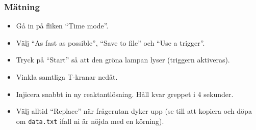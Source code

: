 \subsubsection{Mätning}
\begin{itemize}
\item Gå in på fliken ``Time mode''.
\item Välj ``As fast as possible'', ``Save to file'' och ``Use a trigger''.
\item Tryck på ``Start'' så att den gröna lampan lyser (triggern aktiveras).
\item Vinkla samtliga T-kranar nedåt.
\item Injicera snabbt in ny reaktantlösning. Håll kvar greppet i 4 sekunder.
\item Välj alltid ``Replace'' när frågerutan dyker upp (se till att
  kopiera och döpa om {\tt data.txt} ifall ni är nöjda med en körning).
\end{itemize}

